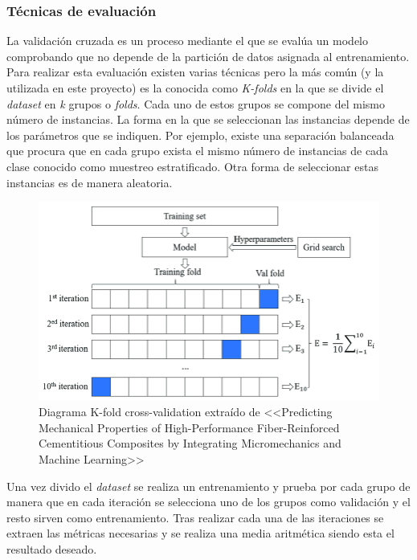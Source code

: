 \subsubsection{Técnicas de evaluación}
La validación cruzada es un proceso mediante el que se evalúa un modelo comprobando que no depende de la partición de datos asignada al entrenamiento. Para realizar esta evaluación existen varias técnicas pero la más común (y la utilizada en este proyecto) es la conocida como \textit{K-folds} en la que se divide el \textit{dataset} en \textit{k} grupos o \textit{folds}. Cada uno de estos grupos se compone del mismo número de instancias. La forma en la que se seleccionan las instancias depende de los parámetros que se indiquen. Por ejemplo, existe una separación balanceada que procura que en cada grupo exista el mismo número de instancias de cada clase conocido como muestreo estratificado. Otra forma de seleccionar estas instancias es de manera aleatoria.
\begin{figure}[h]

	\label{img:k-fold}
	\centering
	\includegraphics[scale=0.5]{./img/concepts/K-Fold.png}
	\caption[Diagrama K-fold cross-validation]{Diagrama K-fold cross-validation extraído de <<Predicting Mechanical Properties of High-Performance Fiber-Reinforced Cementitious Composites by Integrating Micromechanics and Machine Learning>>~\cite{Guo2021}}
\end{figure}

Una vez divido el \textit{dataset} se realiza un entrenamiento y prueba por cada grupo de manera que en cada iteración se selecciona uno de los grupos como validación y el resto sirven como entrenamiento. Tras realizar cada una de las iteraciones se extraen las métricas necesarias y se realiza una media aritmética siendo esta el resultado deseado.


